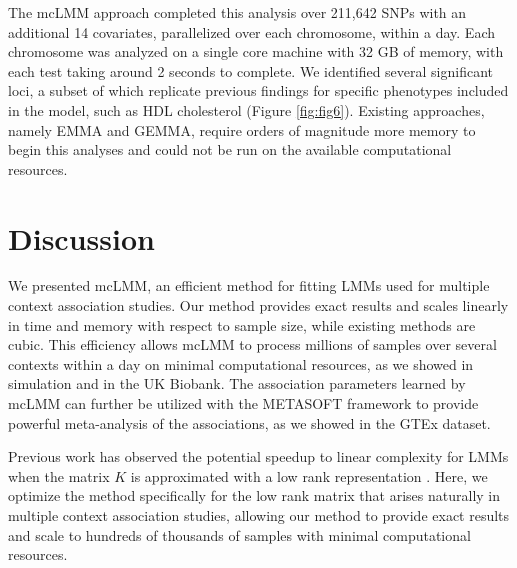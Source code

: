         The mcLMM approach completed this analysis over 211,642 SNPs with an additional 14 covariates, parallelized over each chromosome, within a day. Each chromosome was analyzed on a single core machine with 32 GB of memory, with each test taking around 2 seconds to complete. We identified several significant loci, a subset of which replicate previous findings for specific phenotypes included in the model, such as HDL cholesterol \cite{Wojcik} (Figure \ref{fig:fig6}). Existing approaches, namely EMMA and GEMMA, require orders of magnitude more memory to begin this analyses and could not be run on the available computational resources.
    
        
    \section{Discussion}

    We presented mcLMM, an efficient method for fitting LMMs used for multiple context association studies. Our method provides exact results and scales linearly in time and memory with respect to sample size, while existing methods are cubic. This efficiency allows mcLMM to process millions of samples over several contexts within a day on minimal computational resources, as we showed in simulation and in the UK Biobank. The association parameters learned by mcLMM can further be utilized with the METASOFT framework to provide powerful meta-analysis of the associations, as we showed in the GTEx dataset. 
    
    Previous work has observed the potential speedup to linear complexity for LMMs when the matrix $K$ is approximated with a low rank representation \cite{Lippert2011}. Here, we optimize the method specifically for the low rank matrix that arises naturally in multiple context association studies, allowing our method to provide exact results and scale to hundreds of thousands of samples with minimal computational resources.